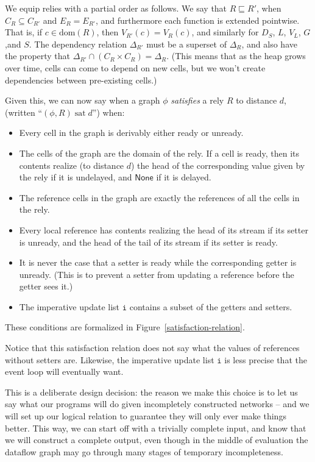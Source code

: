 \documentclass[preprint]{sigplanconf}
\newcommand{\dom}[1]{\mathrm{dom}({#1})}
\newcommand{\term}[1]{\ensuremath{\mathtt{{#1}}}}
\newcommand{\None}{\mathsf{None}}
\newcommand{\satisfy}[2]{{#1}\;\mathrm{sat}\;{#2}}
\begin{document}
We equip relies with a partial order as follows. We say that $R
\sqsubseteq R'$, when $C_R \subseteq C_{R'}$ and $E_R = E_{R'}$, and
furthermore each function is extended pointwise. That is, if $c \in
\dom{R}$, then $V_{R'}(c) = V_{R}(c)$, and similarly for $D_S$, $L$,
$V_L$, $G$,and $S$. The dependency relation $\Delta_{R'}$ must be a
superset of $\Delta_R$, and also have the property that $\Delta_{R'}
\cap (C_R \times C_R) = \Delta_R$. (This means that as the heap grows
over time, cells can come to depend on new cells, but we won't create
dependencies between pre-existing cells.)

Given this, we can now say when a graph $\phi$ \emph{satisfies} a rely $R$ to
distance $d$, (written ``$\satisfy{(\phi, R)}{d}$'') when:
\begin{itemize}
  \item Every cell in the graph is derivably either ready or unready. 
  \item The cells of the graph are the domain of the rely. If a cell
    is ready, then its contents realize (to distance $d$) the head of
    the corresponding value given by the rely if it is undelayed, and
    $\None$ if it is delayed.
  \item The reference cells in the graph are exactly the references
    of all the cells in the rely.
  \item Every local reference has contents realizing the head of its
    stream if its setter is unready, and the head of the tail of its
    stream if its setter is ready. 
  \item It is never the case that a setter is ready while the
    corresponding getter is unready. (This is to prevent a setter
    from updating a reference before the getter sees it.)
  \item The imperative update list \term{i} contains a subset of 
    the getters and setters. 
\end{itemize}

These conditions are formalized in Figure~\ref{satisfaction-relation}. 

Notice that this satisfaction relation does not say what the values of
references without setters are. Likewise, the imperative update list
\term{i} is less precise that the event loop will eventually want.

This is a deliberate design decision: the reason we make this choice
is to let us say what our programs will do given incompletely
constructed networks -- and we will set up our logical relation to
guarantee they will only ever make things better. This way, we can
start off with a trivially complete input, and know that we will
construct a complete output, even though in the middle of evaluation
the dataflow graph may go through many stages of temporary
incompleteness.
\end{document}
